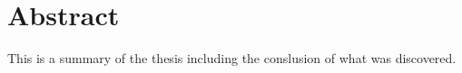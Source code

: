 \chapter*{Abstract}

This is a summary of the thesis including the conslusion of what was discovered.

\hypersetup{pageanchor=false}